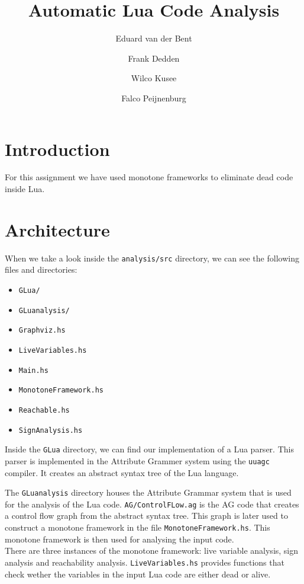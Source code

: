 \documentclass[10pt]{article}
\title{Automatic Lua Code Analysis}
\author{Eduard van der Bent \and Frank Dedden \and Wilco Kusee \and Falco Peijnenburg}
\begin{document}
\maketitle


\section{Introduction}

For this assignment we have used monotone frameworks to eliminate dead code inside Lua.

\section{Architecture} %
When we take a look inside the \texttt{analysis/src} directory, we can see the following files and directories:
\begin{itemize}
	\item \texttt{GLua/}
	\item \texttt{GLuanalysis/}
	\item \texttt{Graphviz.hs}
	\item \texttt{LiveVariables.hs}
	\item \texttt{Main.hs}
	\item \texttt{MonotoneFramework.hs}
	\item \texttt{Reachable.hs}
	\item \texttt{SignAnalysis.hs}
\end{itemize}

Inside the \texttt{GLua} directory, we can find our implementation of a Lua parser. This parser is implemented in the Attribute Grammer system using the \texttt{uuagc} compiler. It creates an abstract syntax tree of the Lua language. %

The \texttt{GLuanalysis} directory houses the Attribute Grammar system that is used for the analysis of the Lua code. \texttt{AG/ControlFLow.ag} is the AG code that creates a control flow graph from the abstract syntax tree. This graph is later used to construct a monotone framework in the file \texttt{MonotoneFramework.hs}. This monotone framework is then used for analysing the input code.\\
There are three instances of the monotone framework: live variable analysis, sign analysis and reachability analysis.
\texttt{LiveVariables.hs} provides functions that check wether the variables in the input Lua code are either dead or alive.\\
\end{document}
